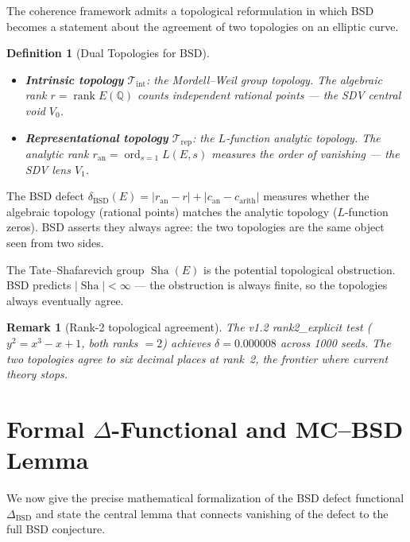 \documentclass[11pt]{article}
\newtheorem{definition}[theorem]{Definition}
\newtheorem{remark}[theorem]{Remark}
\DeclareMathOperator{\Sha}{Sha}
\begin{document}
The coherence framework admits a topological reformulation in which BSD
becomes a statement about the agreement of two topologies on an elliptic
curve.

\begin{definition}[Dual Topologies for BSD]
\label{def:bsd-topo}
\mbox{}
\begin{itemize}
\item \textbf{Intrinsic topology} $\mathcal{T}_{\mathrm{int}}$:
the Mordell--Weil group topology.  The algebraic rank $r = \operatorname{rank}
E(\mathbb{Q})$ counts independent rational points --- the SDV central
void $V_0$.
\item \textbf{Representational topology} $\mathcal{T}_{\mathrm{rep}}$:
the $L$-function analytic topology.  The analytic rank $r_{\mathrm{an}} =
\operatorname{ord}_{s=1} L(E,s)$ measures the order of vanishing --- the
SDV lens $V_1$.
\end{itemize}
\end{definition}

\noindent
The BSD defect $\delta_{\mathrm{BSD}}(E) = |r_{\mathrm{an}} - r| +
|c_{\mathrm{an}} - c_{\mathrm{arith}}|$ measures whether the algebraic
topology (rational points) matches the analytic topology ($L$-function
zeros).  BSD asserts they always agree: the two topologies are the
same object seen from two sides.

The Tate--Shafarevich group $\Sha(E)$ is the potential topological
obstruction.  BSD predicts $|\Sha| < \infty$ --- the obstruction is
always finite, so the topologies always eventually agree.

\begin{remark}[Rank-2 topological agreement]
The v1.2 rank2\_explicit test ($y^2 = x^3 - x + 1$, both ranks $= 2$)
achieves $\delta = 0.000008$ across 1000 seeds.  The two topologies
agree to six decimal places at rank~2, the frontier where current
theory stops.
\end{remark}

\section{Formal $\Delta$-Functional and MC--BSD Lemma}
\label{sec:delta-functional}

We now give the precise mathematical formalization of the BSD defect
functional $\Delta_{\mathrm{BSD}}$ and state the central lemma that
connects vanishing of the defect to the full BSD conjecture.
\end{document}
